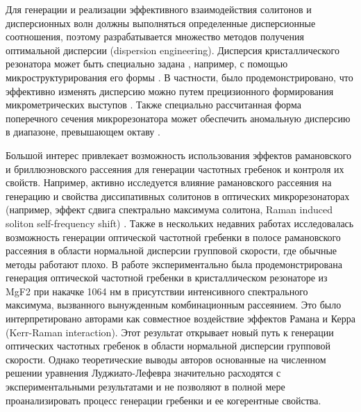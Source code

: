 Для генерации и реализации эффективного взаимодействия солитонов и дисперсионных волн должны выполняться определенные дисперсионные соотношения, поэтому разрабатывается множество методов получения оптимальной дисперсии (dispersion engineering). Дисперсия кристаллического резонатора может быть специально задана \cite{Grudinin2012,Jiang2014,Okawachi2014,Zhang2014,Zhang2013,Grudinin2015,Nakagawa2016}, например, с помощью микроструктурирования его формы \cite{Grudinin2015,Nakagawa2016}. В частности, было продемонстрировано, что эффективно изменять дисперсию можно путем прецизионного формирования микрометрических выступов \cite{Grudinin2015}. Также специально рассчитанная форма поперечного сечения микрорезонатора может обеспечить аномальную дисперсию в диапазоне, превышающем октаву \cite{Nakagawa2016}.


Большой интерес привлекает возможность использования эффектов рамановского и бриллюэновского рассеяния для генерации частотных гребенок и контроля их свойств. Например, активно исследуется влияние рамановского рассеяния на генерацию и свойства диссипативных солитонов в оптических микрорезонаторах (например, эффект сдвига спектрально максимума солитона, Raman induced soliton self-frequency shift) \cite{Hansson2014ol,Milian2015,Yi2016,Karpov2016,Bao2017}. Также в нескольких недавних работах \cite{Chembo2015,Chembo2016} исследовалась возможность генерации оптической частотной гребенки в полосе рамановского рассеяния в области нормальной дисперсии групповой скорости, где обычные методы работают плохо. В работе \cite{Chembo2015} экспериментально была продемонстрирована генерация оптической частотной гребенки в кристаллическом резонаторе из MgF2 при накачке 1064 нм в присутствии интенсивного спектрального максимума, вызванного вынужденным комбинационным рассеянием. Это было интерпретировано авторами как совместное воздействие эффектов Рамана и Керра (Kerr-Raman interaction). Этот результат открывает новый путь к генерации оптических частотных гребенок в области нормальной дисперсии групповой скорости. Однако теоретические выводы авторов основанные на численном решении уравнения Луджиато-Лефевра значительно расходятся с экспериментальными результатами и не позволяют в полной мере проанализировать процесс генерации гребенки и ее когерентные свойства.



